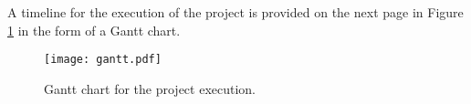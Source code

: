 \documentclass[11pt]{article}
\begin{document}
\noindent A timeline for the execution of the project is provided on the next page in Figure \ref{fig:gantt} in the form of a Gantt chart.

\begin{landscape}
    \pagestyle{empty}%
    \begin{figure}
        \hspace{-2.5cm}
        \texttt{[image: gantt.pdf]}
        \caption{Gantt chart for the project execution.}
        \label{fig:gantt}
\end{figure}
\end{landscape}


\printbibliography
\end{document}
